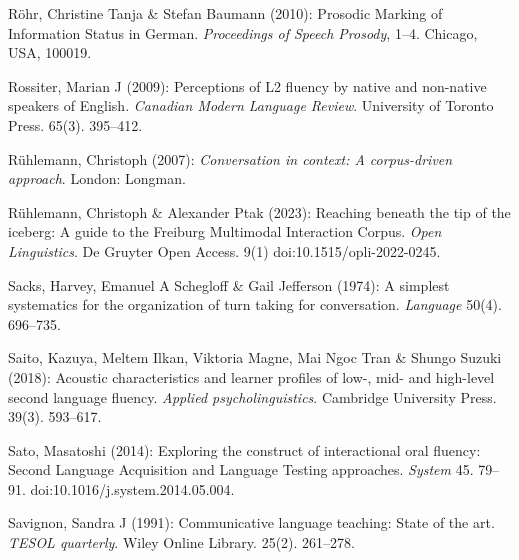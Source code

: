\begin{styleBibliography}
Röhr, Christine Tanja \& Stefan Baumann (2010): Prosodic Marking of Information Status in German. \textit{Proceedings of Speech Prosody}, 1–4. Chicago, USA, 100019.
\end{styleBibliography}

\begin{styleBibliography}
Rossiter, Marian J (2009): Perceptions of L2 fluency by native and non-native speakers of English. \textit{Canadian Modern Language Review}. University of Toronto Press. 65(3). 395–412.
\end{styleBibliography}

\begin{styleBibliography}
Rühlemann, Christoph (2007): \textit{Conversation in context: A corpus-driven approach}. London: Longman.
\end{styleBibliography}

\begin{styleBibliography}
Rühlemann, Christoph \& Alexander Ptak (2023): Reaching beneath the tip of the iceberg: A guide to the Freiburg Multimodal Interaction Corpus. \textit{Open Linguistics}. De Gruyter Open Access. 9(1) doi:10.1515/opli-2022-0245.
\end{styleBibliography}

\begin{styleBibliography}
Sacks, Harvey, Emanuel A Schegloff \& Gail Jefferson (1974): A simplest systematics for the organization of turn taking for conversation. \textit{Language} 50(4). 696–735.
\end{styleBibliography}

\begin{styleBibliography}
Saito, Kazuya, Meltem Ilkan, Viktoria Magne, Mai Ngoc Tran \& Shungo Suzuki (2018): Acoustic characteristics and learner profiles of low-, mid- and high-level second language fluency. \textit{Applied psycholinguistics}. Cambridge University Press. 39(3). 593–617.
\end{styleBibliography}

\begin{styleBibliography}
Sato, Masatoshi (2014): Exploring the construct of interactional oral fluency: Second Language Acquisition and Language Testing approaches. \textit{System} 45. 79–91. doi:10.1016/j.system.2014.05.004.
\end{styleBibliography}

\begin{styleBibliography}
Savignon, Sandra J (1991): Communicative language teaching: State of the art. \textit{TESOL quarterly}. Wiley Online Library. 25(2). 261–278.
\end{styleBibliography}

